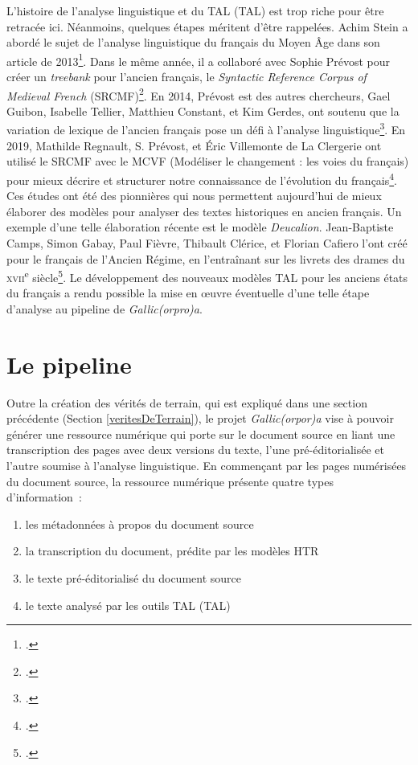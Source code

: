 \documentclass[class=article, crop=false]{standalone}
\begin{document}
L'histoire de l'analyse linguistique et du \acrlong{TAL} (\acrshort{TAL}) est trop riche pour être retracée ici. Néanmoins, quelques étapes méritent d'être rappelées. Achim Stein a abordé le sujet de l'analyse linguistique du français du Moyen Âge dans son article de 2013\footcite{steinSyntacticAnnotationMedieval2013}. Dans le même année, il a collaboré avec Sophie Prévost pour créer un \textit{treebank} pour l'ancien français, le \textit{Syntactic Reference Corpus of Medieval French} (SRCMF)\footcite{steinSyntacticReferenceCorpus2013}. En 2014, Prévost est des autres chercheurs, Gael Guibon, Isabelle Tellier, Matthieu Constant, et Kim Gerdes, ont soutenu que la variation de lexique de l'ancien français pose un défi à l'analyse linguistique\footcite{guibonParsingPoorlyStandardized2014}. En 2019, Mathilde Regnault, S. Prévost, et Éric Villemonte de La Clergerie ont utilisé le SRCMF avec le MCVF (Modéliser le changement : les voies du français) pour mieux décrire et structurer notre connaissance de l'évolution du français\footcite{regnaultChallengesLanguageChange2019}. Ces études ont été des pionnières qui nous permettent aujourd'hui de mieux élaborer des modèles pour analyser des textes historiques en ancien français. Un exemple d'une telle élaboration récente est le modèle \textit{Deucalion}. Jean-Baptiste Camps, Simon Gabay, Paul Fièvre, Thibault Clérice, et Florian Cafiero l'ont créé pour le français de l'Ancien Régime, en l'entraînant sur les livrets des drames du \textsc{xvii}\textsuperscript{e} siècle\footcite{campsCorpusModelsLemmatisation2021}. Le développement des nouveaux modèles TAL pour les anciens états du français a rendu possible la mise en œuvre éventuelle d'une telle étape d'analyse au pipeline de \textit{Gallic(orpro)a}.


\section{Le pipeline}
Outre la création des vérités de terrain, qui est expliqué dans une section précédente (Section \ref{veritesDeTerrain}), le projet \textit{Gallic(orpor)a} vise à pouvoir générer une ressource numérique qui porte sur le document source en liant une transcription des pages avec deux versions du texte, l'une pré-éditorialisée et l'autre soumise à l'analyse linguistique. En commençant par les pages numérisées du document source, la ressource numérique présente quatre types d'information~:
\begin{enumerate}
\item les métadonnées à propos du document source
\item la transcription du document, prédite par les modèles \acrshort{HTR}
\item le texte pré-éditorialisé du document source
\item le texte analysé par les outils \acrlong{TAL} (\acrshort{TAL})
\end{enumerate}
\end{document}
